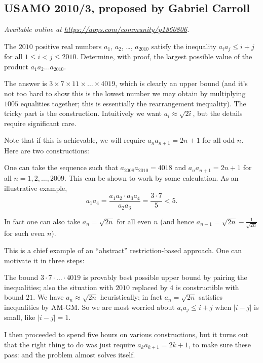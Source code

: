 \documentclass[11pt]{scrartcl}
\begin{document}
\subsection{USAMO 2010/3, proposed by Gabriel Carroll}
\textsl{Available online at \url{https://aops.com/community/p1860806}.}
\begin{mdframed}[style=mdpurplebox,frametitle={Problem statement}]
The $2010$ positive real numbers $a_1$, $a_2$, \dots , $a_{2010}$
satisfy the inequality $a_i a_j \le i+j$
for all $1 \le i < j \le 2010$.
Determine, with proof, the largest possible value
of the product $a_1a_2\dots a_{2010}$.
\end{mdframed}
The answer is $3 \times 7 \times 11 \times \dots \times 4019$,
which is clearly an upper bound
(and it's not too hard to show this is the lowest
number we may obtain by multiplying $1005$ equalities together;
this is essentially the rearrangement inequality).
The tricky part is the construction.
Intuitively we want $a_i \approx \sqrt{2i}$,
but the details require significant care.

Note that if this is achievable,
we will require $a_n a_{n+1} = 2n+1$ for all odd $n$.
Here are two constructions:
\begin{itemize}
\ii One can take the sequence such that $a_{2008} a_{2010} = 4018$
  and $a_n a_{n+1} = 2n+1$ for all $n = 1, 2, \dots, 2009$.
  This can be shown to work by some calculation. As an illustrative example,
  \[ a_1 a_4 = \frac{a_1a_2 \cdot a_3a_4}{a_2a_3} = \frac{3 \cdot 7}{5} < 5. \]

\ii In fact one can also take $a_n = \sqrt{2n}$ for all even $n$
  (and hence $a_{n-1} = \sqrt{2n} - \frac{1}{\sqrt{2n}}$ for such even $n$).
\end{itemize}

\begin{remark*}
This is a chief example of an ``abstract'' restriction-based approach.
One can motivate it in three steps:
\begin{itemize}
\ii The bound $3 \cdot 7 \cdot \dots \cdot 4019$ is provably best possible
upper bound by pairing the inequalities;
also the situation with $2010$ replaced by $4$
is constructible with bound $21$.
\ii We have $a_n \approx \sqrt{2n}$ heuristically;
in fact $a_n = \sqrt{2n}$ satisfies inequalities by AM-GM.
\ii So we are most worried about $a_i a_j \le i+j$
when $|i-j|$ is small, like $|i-j| = 1$.
\end{itemize}
I then proceeded to spend five hours on various constructions,
but it turns out that the right thing to do was just require
$a_k a_{k+1} = 2k+1$, to make sure these pass:
and the problem almost solves itself.
\end{remark*}
\end{document}
